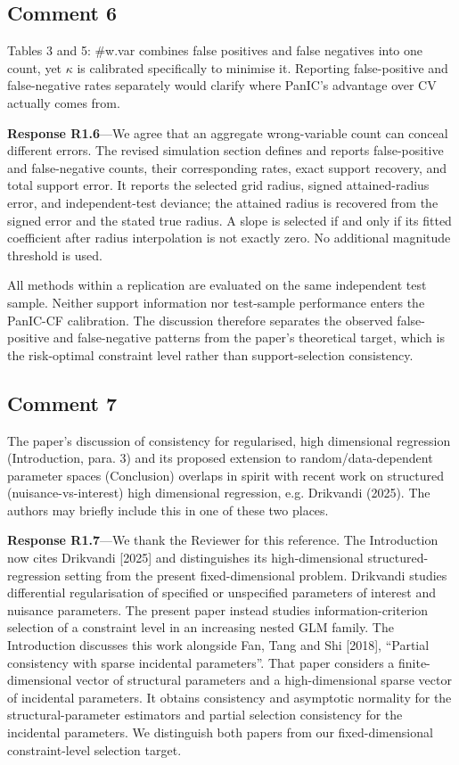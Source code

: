 \documentclass[11pt]{article}
\newcommand{\response}[1]{\par\noindent\textbf{Response #1}---}
\begin{document}
\subsection*{Comment 6}
Tables 3 and 5: \#w.var combines false positives and false negatives into one count, yet $\kappa$ is calibrated specifically to minimise it. Reporting false-positive and false-negative rates separately would clarify where PanIC's advantage over CV actually comes from.

\response{R1.6}We agree that an aggregate wrong-variable count can conceal different errors. The revised simulation section defines and reports false-positive and false-negative counts, their corresponding rates, exact support recovery, and total support error. It reports the selected grid radius, signed attained-radius error, and independent-test deviance; the attained radius is recovered from the signed error and the stated true radius. A slope is selected if and only if its fitted coefficient after radius interpolation is not exactly zero. No additional magnitude threshold is used.

All methods within a replication are evaluated on the same independent test sample. Neither support information nor test-sample performance enters the PanIC-CF calibration. The discussion therefore separates the observed false-positive and false-negative patterns from the paper's theoretical target, which is the risk-optimal constraint level rather than support-selection consistency.

\subsection*{Comment 7}
The paper's discussion of consistency for regularised, high dimensional regression (Introduction, para. 3) and its proposed extension to random/data-dependent parameter spaces (Conclusion) overlaps in spirit with recent work on structured (nuisance-vs-interest) high dimensional regression, e.g. Drikvandi (2025). The authors may briefly include this in one of these two places.

\response{R1.7}We thank the Reviewer for this reference. The Introduction now cites Drikvandi [2025] and distinguishes its high-dimensional structured-regression setting from the present fixed-dimensional problem. Drikvandi studies differential regularisation of specified or unspecified parameters of interest and nuisance parameters. The present paper instead studies information-criterion selection of a constraint level in an increasing nested GLM family. The Introduction discusses this work alongside Fan, Tang and Shi [2018], ``Partial consistency with sparse incidental parameters''. That paper considers a finite-dimensional vector of structural parameters and a high-dimensional sparse vector of incidental parameters. It obtains consistency and asymptotic normality for the structural-parameter estimators and partial selection consistency for the incidental parameters. We distinguish both papers from our fixed-dimensional constraint-level selection target.
\end{document}
